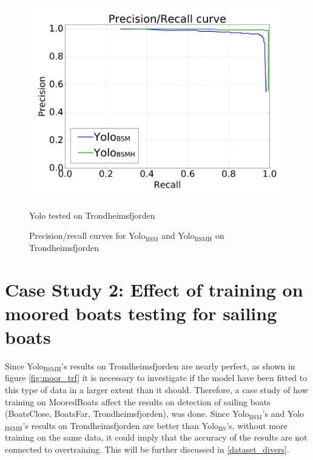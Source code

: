 \begin{figure}[h!]
  \centering
  \includegraphics[width=0.8\linewidth]{results/case_buildings/prec_recall/yolo/trf-eps.png}
  \caption{Yolo tested on Trondheimsfjorden}
  \label{fig:ex_trf_prec_rec_yolo}
\caption{Precision/recall curves for Yolo$_{\text{BSM}}$ and Yolo$_{\text{BSMH}}$ on Trondheimsfjorden}
\label{fig:yolo_trf_prec}
\end{figure}

\newpage
\clearpage

\section{Case Study 2: Effect of training on moored boats testing for sailing boats}
\label{sec:moored_boats}

Since Yolo$_{\text{BSMH}}$'s results on Trondheimsfjorden are nearly perfect, as shown in figure \ref{fig:moor_trf} it is necessary to investigate if the model have been fitted to this type of data in a larger extent than it should. Therefore, a case study of how training on MooredBoats affect the results on detection of sailing boats (BoatsClose, BoatsFar, Trondheimsfjorden), was done. Since Yolo$_{\text{BSM}}$'s and Yolo$_{\text{BSMH}}$'s results on Trondheimsfjorden are better than Yolo$_{\text{BS}}$'s, without more training on the same data, it could imply that the accuracy of the results are not connected to overtraining. This will be further discussed in \ref{dataset_divers}.


